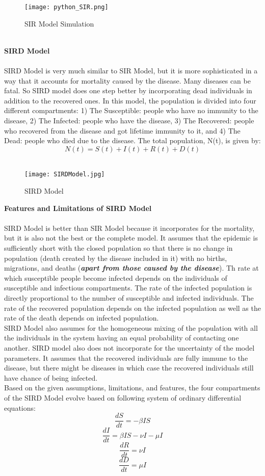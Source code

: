\documentclass[11pt]{article}
\theoremstyle{definition}
\begin{document}
\begin{figure}[htp]
\centering
    \texttt{[image: python\_SIR.png]}
    \caption{SIR Model Simulation}
\end{figure}
\\
\textbf{\Large SIRD Model}\\
\\
SIRD Model is very much similar to SIR Model, but it is more sophisticated in a way that it accounts for mortality caused by the disease. Many diseases can be fatal. So SIRD model does one step better by incorporating dead individuals in addition to the recovered ones. In this model, the population is divided into four different compartments: 1) The Susceptible:  people who have no immunity to the disease, 2) The Infected:  people who have the disease, 3) The Recovered:  people who recovered from the disease and got lifetime immunity to it, and 4) The Dead: people who died due to the disease. The total population, N(t), is given by:
$$N(t) =S(t) +I(t)+R(t) +D(t)$$
\\

\begin{figure}[htp]
\centering
    \texttt{[image: SIRDModel.jpg]}
    \caption{SIRD Model}
\end{figure}

{\textbf{\large Features and Limitations of SIRD Model}}\\
\\
SIRD Model is better than SIR Model because it incorporates for the mortality, but it is also not the best or the complete model. It assumes that the epidemic is sufficiently short with the closed population so that there is no change in population (death created by the disease included in it) with no births, migrations, and deaths (\textbf{\textit{apart from those caused by the disease}}). Th rate at which susceptible people become infected depends on the individuals of susceptible and infectious compartments. The rate of the infected population is directly proportional to the number of susceptible and infected individuals. The rate of the recovered population depends on the infected population as well as the rate of the death depends on infected population.\\
SIRD Model also assumes for the homogeneous mixing of the population with all the individuals in the system having an equal probability of contacting one another. SIRD model also does not incorporate for the uncertainty of the model parameters. It assumes that the recovered individuals are fully immune to the disease, but there might be diseases in which case the recovered individuals still have chance of being infected.\\
Based on the given assumptions, limitations, and features, the four compartments of the SIRD Model evolve based on following system of ordinary differential equations:
$$\frac{dS}{dt}=-\beta IS$$
$$\frac{dI}{dt}=\beta IS - \nu I - \mu I$$
$$\frac{dR}{dt}=\nu I$$
$$\frac{dD}{dt}=\mu I$$
\\
\end{document}
